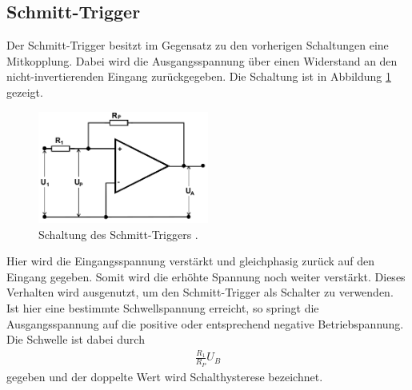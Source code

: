 \subsection{Schmitt-Trigger}
Der Schmitt-Trigger besitzt im Gegensatz zu
den vorherigen Schaltungen eine Mitkopplung. 
Dabei wird die Ausgangsspannung über
einen Widerstand an den nicht-invertierenden
Eingang zurückgegeben. Die Schaltung ist in
Abbildung \ref{pic:schmitt} gezeigt. 
\begin{figure}[t]
 \includegraphics[width = 0.5\textwidth]{../pics/schmitt.png}
 \caption{Schaltung des Schmitt-Triggers \cite{Anl}.}
 \label{pic:schmitt}
\end{figure}
Hier wird die Eingangsspannung 
verstärkt und gleichphasig zurück auf
den Eingang gegeben. Somit wird die erhöhte
Spannung noch weiter verstärkt. Dieses Verhalten 
wird ausgenutzt, um den Schmitt-Trigger
als Schalter zu verwenden. Ist hier eine bestimmte 
Schwellspannung erreicht, so springt
die Ausgangsspannung auf die positive oder
entsprechend negative Betriebspannung. Die
Schwelle ist dabei durch
\begin{align}
 \frac{R_1}{R_P} U_B
\end{align}
gegeben und der doppelte Wert wird Schalthysterese bezeichnet.

